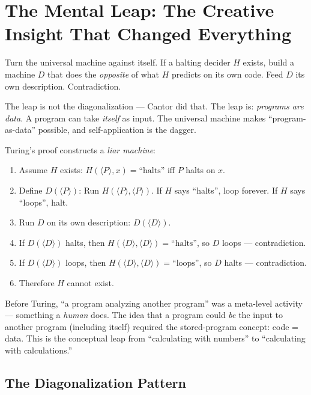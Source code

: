 \section{The Mental Leap: The Creative Insight That Changed Everything}
\label{sec:halting:leap}

Turn the universal machine against itself. If a halting decider $H$ exists, build a machine $D$ that does the \emph{opposite} of what $H$ predicts on its own code. Feed $D$ its own description. Contradiction.

The leap is not the diagonalization — Cantor did that. The leap is: \emph{programs are data}. A program can take \emph{itself} as input. The universal machine makes ``program-as-data'' possible, and self-application is the dagger.

Turing's proof constructs a \emph{liar machine}:

\begin{enumerate}
\item Assume $H$ exists: $H(\langle P \rangle, x) = \text{``halts''}$ iff $P$ halts on $x$.
\item Define $D(\langle P \rangle)$: Run $H(\langle P \rangle, \langle P \rangle)$. If $H$ says ``halts'', loop forever. If $H$ says ``loops'', halt.
\item Run $D$ on its own description: $D(\langle D \rangle)$.
\item If $D(\langle D \rangle)$ halts, then $H(\langle D \rangle, \langle D \rangle) = \text{``halts''}$, so $D$ loops — contradiction.
\item If $D(\langle D \rangle)$ loops, then $H(\langle D \rangle, \langle D \rangle) = \text{``loops''}$, so $D$ halts — contradiction.
\item Therefore $H$ cannot exist.
\end{enumerate}

Before Turing, ``a program analyzing another program'' was a meta-level activity — something a \emph{human} does. The idea that a program could \emph{be} the input to another program (including itself) required the stored-program concept: code = data. This is the conceptual leap from ``calculating with numbers'' to ``calculating with calculations.''

\subsection*{The Diagonalization Pattern}

